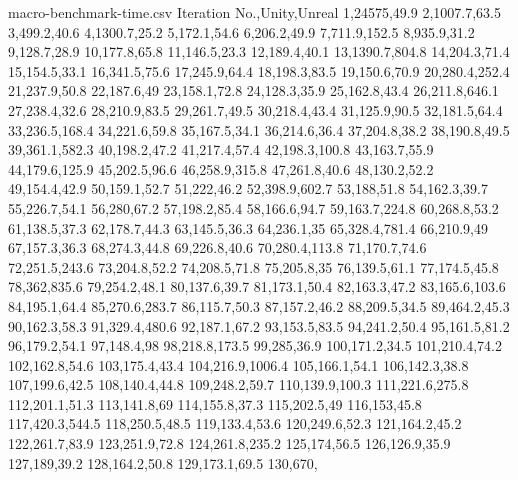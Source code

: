 \begin{filecontents*}{macro-benchmark-time.csv}
Iteration No.,Unity,Unreal
1,24575,49.9
2,1007.7,63.5
3,499.2,40.6
4,1300.7,25.2
5,172.1,54.6
6,206.2,49.9
7,711.9,152.5
8,935.9,31.2
9,128.7,28.9
10,177.8,65.8
11,146.5,23.3
12,189.4,40.1
13,1390.7,804.8
14,204.3,71.4
15,154.5,33.1
16,341.5,75.6
17,245.9,64.4
18,198.3,83.5
19,150.6,70.9
20,280.4,252.4
21,237.9,50.8
22,187.6,49
23,158.1,72.8
24,128.3,35.9
25,162.8,43.4
26,211.8,646.1
27,238.4,32.6
28,210.9,83.5
29,261.7,49.5
30,218.4,43.4
31,125.9,90.5
32,181.5,64.4
33,236.5,168.4
34,221.6,59.8
35,167.5,34.1
36,214.6,36.4
37,204.8,38.2
38,190.8,49.5
39,361.1,582.3
40,198.2,47.2
41,217.4,57.4
42,198.3,100.8
43,163.7,55.9
44,179.6,125.9
45,202.5,96.6
46,258.9,315.8
47,261.8,40.6
48,130.2,52.2
49,154.4,42.9
50,159.1,52.7
51,222,46.2
52,398.9,602.7
53,188,51.8
54,162.3,39.7
55,226.7,54.1
56,280,67.2
57,198.2,85.4
58,166.6,94.7
59,163.7,224.8
60,268.8,53.2
61,138.5,37.3
62,178.7,44.3
63,145.5,36.3
64,236.1,35
65,328.4,781.4
66,210.9,49
67,157.3,36.3
68,274.3,44.8
69,226.8,40.6
70,280.4,113.8
71,170.7,74.6
72,251.5,243.6
73,204.8,52.2
74,208.5,71.8
75,205.8,35
76,139.5,61.1
77,174.5,45.8
78,362,835.6
79,254.2,48.1
80,137.6,39.7
81,173.1,50.4
82,163.3,47.2
83,165.6,103.6
84,195.1,64.4
85,270.6,283.7
86,115.7,50.3
87,157.2,46.2
88,209.5,34.5
89,464.2,45.3
90,162.3,58.3
91,329.4,480.6
92,187.1,67.2
93,153.5,83.5
94,241.2,50.4
95,161.5,81.2
96,179.2,54.1
97,148.4,98
98,218.8,173.5
99,285,36.9
100,171.2,34.5
101,210.4,74.2
102,162.8,54.6
103,175.4,43.4
104,216.9,1006.4
105,166.1,54.1
106,142.3,38.8
107,199.6,42.5
108,140.4,44.8
109,248.2,59.7
110,139.9,100.3
111,221.6,275.8
112,201.1,51.3
113,141.8,69
114,155.8,37.3
115,202.5,49
116,153,45.8
117,420.3,544.5
118,250.5,48.5
119,133.4,53.6
120,249.6,52.3
121,164.2,45.2
122,261.7,83.9
123,251.9,72.8
124,261.8,235.2
125,174,56.5
126,126.9,35.9
127,189,39.2
128,164.2,50.8
129,173.1,69.5
130,670,
\end{filecontents*}